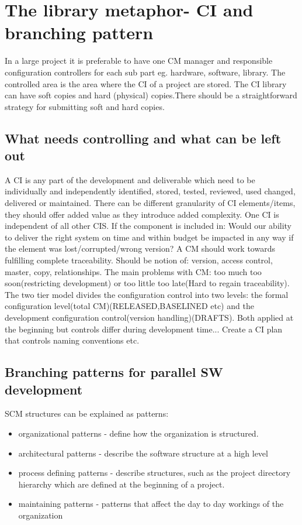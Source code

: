 \documentclass{article}
\begin{document}
\section{The library metaphor- CI and branching pattern}
In a large project it is preferable to have one CM manager and responsible configuration controllers for each sub part eg. hardware, software, library. The controlled area is the area
where the CI of a project are stored. The CI library can have soft copies and hard (physical) copies.There should be a straightforward strategy for submitting soft and hard copies.
\subsection{What needs controlling and what can be left out}
A CI is any part of the development and deliverable which need to be individually and independently identified, stored, tested, reviewed, used changed, delivered or maintained. There can be different 
granularity of CI elements/items, they should offer added value as they introduce added complexity. One CI is independent of all other CIS.
If the component is included in: Would our ability to deliver the right system on time and within budget be impacted in any way if the element was lost/corrupted/wrong version? 
A CM should work towards fulfilling complete traceability. Should be notion of: version, access control, master, copy, relationships.
The main problems with CM: too much too soon(restricting development) or too little too late(Hard to regain traceability). The two tier model divides the configuration control into two levels:
the formal configuration level(total CM)(RELEASED,BASELINED etc) and the development configuration control(version handling)(DRAFTS). Both applied at the beginning but controls differ during development time... 
Create a CI plan that controls naming conventions etc. 
\subsection{Branching patterns for parallel SW development}
SCM structures can be explained as patterns:
\begin{itemize}
    \item organizational patterns - define how the organization is structured.
    \item architectural patterns - describe the software structure at a high level
    \item process defining patterns - describe structures, such as the project directory hierarchy which are defined at the beginning of a project.
    \item maintaining patterns - patterns that affect the day to day workings of the organization
\end{itemize}
\end{document}
